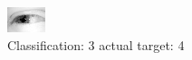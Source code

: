 \begin{figure}[h!]
\begin{center}
\includegraphics[width=0.60\columnwidth]{figures/ID2534_class_3_target_4.png}
\end{center}
\caption{ Classification: 3 actual target: 4}
\label{fig:ID2534_class_3_target_4}
\end{figure}
